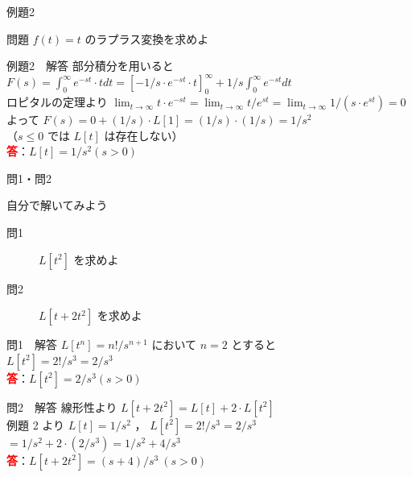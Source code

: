 \documentclass[professionalfonts]{beamer}
\begin{document}
\begin{frame}{例題2}
  \begin{exampleblock}{問題}
    $f(t) = t$ のラプラス変換を求めよ\\[2pt]
  \end{exampleblock}
\end{frame}

\begin{frame}{例題2　解答}
  部分積分を用いると\\[4pt]
  $F(s) = \int_{0}^\infty e^{-st}\cdot t dt = [-1/s \cdot e^{-st} \cdot t]_{0}^\infty + 1/s \int_{0}^\infty e^{-st} dt$\\[4pt]
  ロピタルの定理より $\lim_{t \to \infty} t\cdot e^{-st} = \lim_{t \to \infty} t/e^{st} = \lim_{t \to \infty} 1/(s\cdot e^{st}) = 0$\\[4pt]
  よって $F(s) = 0 + (1/s)\cdot L[1] = (1/s)\cdot(1/s) = 1/s^{2}$\\[4pt]
  （$s \leq 0$ では $L[t]$ は存在しない）
  \\[8pt]\textcolor{red}{\textbf{答}}：$L[t] = 1/s^{2}  (s > 0)$
\end{frame}

\begin{frame}{問1・問2}
  \begin{exampleblock}{自分で解いてみよう}
  \begin{description}
    \item[問1] $L[t^2]$ を求めよ
    \item[問2] $L[t + 2t^2]$ を求めよ
  \end{description}
  \end{exampleblock}
\end{frame}

\begin{frame}{問1　解答}
  $L[t^{n}] = n!/s^{n+1}$ において $n = 2$ とすると\\[4pt]
  $L[t^{2}] = 2!/s^{3} = 2/s^{3}$
  \\[8pt]\textcolor{red}{\textbf{答}}：$L[t^{2}] = 2/s^{3}  (s > 0)$
\end{frame}

\begin{frame}{問2　解答}
  線形性より $L[t + 2t^{2}] = L[t] + 2\cdot L[t^{2}]$\\[4pt]
  例題 2 より $L[t] = 1/s^{2}$ ， $L[t^{2}] = 2!/s^{3} = 2/s^{3}$\\[4pt]
  $= 1/s^{2} + 2\cdot(2/s^{3}) = 1/s^{2} + 4/s^{3}$
  \\[8pt]\textcolor{red}{\textbf{答}}：$L[t + 2t^{2}] = (s+4)/s^{3} \ (s > 0)$
\end{frame}
\end{document}
